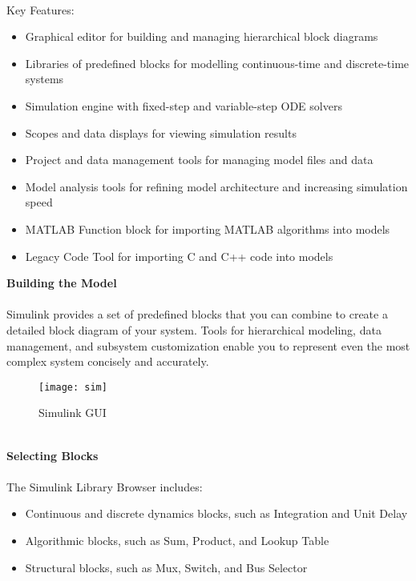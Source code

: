 \documentclass[14pt]{report}
\begin{document}
{\paragraph{} Key Features:
\begin{itemize}
\item Graphical editor for building and managing hierarchical block diagrams
\item Libraries of predefined blocks for modelling continuous-time and discrete-time systems
\item Simulation engine with fixed-step and variable-step ODE solvers
\item Scopes and data displays for viewing simulation results
\item Project and data management tools for managing model files and data
\item Model analysis tools for refining model architecture and increasing simulation speed
\item MATLAB Function block for importing MATLAB algorithms into models
\item Legacy Code Tool for importing C and C++  code into models
\end{itemize}
\textbf{Building the Model}
\paragraph{} Simulink provides a set of predefined blocks that you can combine to create a detailed block diagram of your system. Tools for hierarchical modeling, data management, and subsystem customization enable you to represent even the most complex system concisely and accurately.\\
\begin{figure}[ht]
\centering
\texttt{[image: sim]}
\caption{Simulink GUI}
\end{figure}\\
\textbf{Selecting Blocks}
\paragraph{} The Simulink Library Browser includes:
\begin{itemize}
\item Continuous and discrete dynamics blocks, such as Integration and Unit Delay
\item Algorithmic blocks, such as Sum, Product, and Lookup Table
\item Structural blocks, such as Mux, Switch, and Bus Selector
\end{itemize}
}
\end{document}
